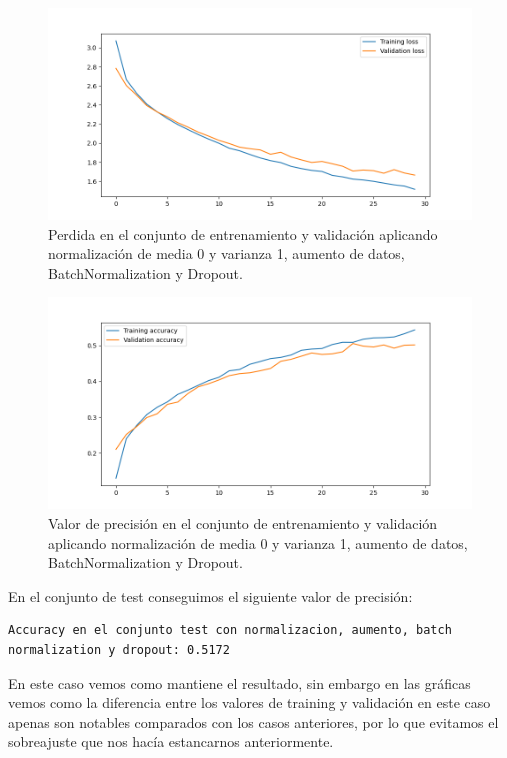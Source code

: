 \documentclass[12pt, spanish]{article}
\begin{document}
\begin{figure}[H]
  \centering
      \includegraphics[width=\textwidth]{1-2-dropout.png}
 		\caption{Perdida en el conjunto de entrenamiento y validación aplicando normalización de media 0 y varianza 1, aumento de datos, BatchNormalization y Dropout.}
\end{figure}

\begin{figure}[H]
  \centering
      \includegraphics[width=\textwidth]{1-2-dropout-2.png}
 		\caption{Valor de precisión en el conjunto de entrenamiento y validación aplicando normalización de media 0 y varianza 1, aumento de datos, BatchNormalization y Dropout.}
\end{figure}



En el conjunto de test conseguimos el siguiente valor de precisión:

\begin{lstlisting}
Accuracy en el conjunto test con normalizacion, aumento, batch normalization y dropout: 0.5172
\end{lstlisting}

En este caso vemos como mantiene el resultado, sin embargo en las gráficas vemos como la diferencia entre los valores de training y validación en este caso apenas son notables comparados con los casos anteriores, por lo que evitamos el sobreajuste que nos hacía estancarnos anteriormente.
\end{document}
